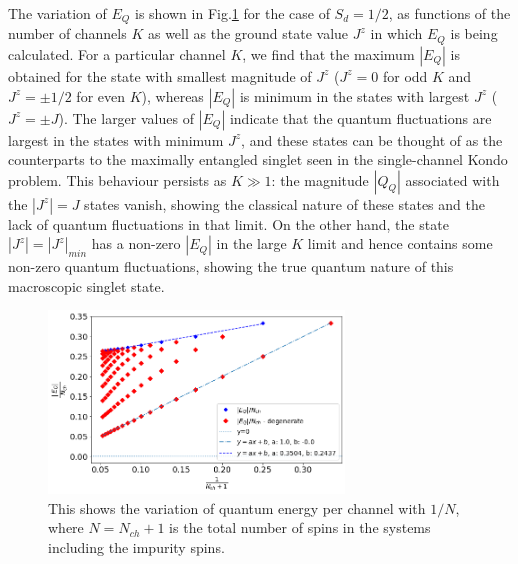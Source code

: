 \documentclass[reprint,onecolumn,prb,superscriptaddress]{revtex4-2}
\begin{document}
The variation of \(E_Q\) is shown in Fig.\ref{fig:quantum_energy} for the case of $S_d=1/2$, as functions of the number of channels \(K\) as well as the ground state value \(J^z\) in which \(E_Q\) is being calculated. For a particular channel $K$, we find that the maximum \(|E_Q|\) is obtained for the state with smallest magnitude of $J^z$ (\(J^z = 0 \) for odd \(K\) and \(J^z = \pm 1/2\) for even \(K\)), whereas \(|E_Q|\) is minimum in the states with largest \(J^z\) ($J^z=\pm J$). The larger values of \(|E_Q|\) indicate that the quantum fluctuations are largest in the states with minimum \(J^z\), and these states can be thought of as the counterparts to the maximally entangled singlet seen in the single-channel Kondo problem. This behaviour persists as \(K \gg 1\): the magnitude \(|Q_Q|\) associated with the $|J^z|= J$ states vanish, showing the classical nature of these states and the lack of quantum fluctuations in that limit. On the other hand, the state $|J^z| = |J^z|_{min}$ has a non-zero \(|E_Q|\) in the large \(K\) limit and hence contains some non-zero quantum fluctuations, showing the true quantum nature of this macroscopic singlet state.

\begin{figure}[!htb]
\centering
\includegraphics[width=0.7\textwidth]{plt/QuantumEnergyperchannel}
\caption{This shows the variation of quantum energy per channel with $1/N$, where $N=N_{ch}+1$ is the total number of spins in the systems including the impurity spins.}
\label{fig:quantum_energy}
\end{figure}
\end{document}
